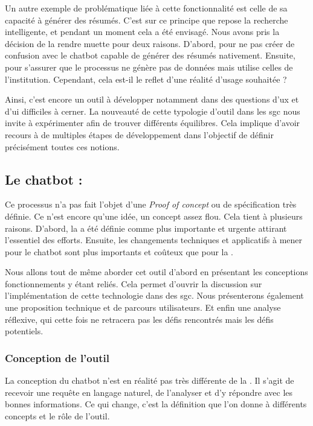 Un autre exemple de problématique liée à cette fonctionnalité est celle de sa capacité à générer des résumés. C'est sur ce principe que repose la recherche intelligente, et pendant un moment cela a été envisagé. Nous avons pris la décision de la rendre muette pour deux raisons. D'abord, pour ne pas créer de confusion avec le \gls{chatbot} capable de générer des résumés nativement. Ensuite, pour s'assurer que le processus ne génère pas de données mais utilise celles de l’institution. Cependant, cela est-il le reflet d'une réalité d'usage souhaitée ?\newline 

Ainsi, c'est encore un outil à développer notamment dans des questions d'\gls{ux} et d'\gls{ui} difficiles à cerner. La nouveauté de cette typologie d'outil dans les \gls{sgc} nous invite à expérimenter afin de trouver différents équilibres. Cela implique d'avoir recours à de multiples étapes de développement dans l'objectif de définir précisément toutes ces notions. 

\subsection{Le \gls{chatbot} :}

Ce processus n'a pas fait l'objet d'une \textit{Proof of concept} ou de spécification très définie. Ce n'est encore qu'une idée, un concept assez flou. Cela tient à plusieurs raisons. D'abord, la  a été définie comme plus importante et urgente attirant l'essentiel des efforts. Ensuite, les changements techniques et applicatifs à mener pour le \gls{chatbot} sont plus importants et coûteux que pour la .\newline

Nous allons tout de même aborder cet outil d'abord en présentant les conceptions fonctionnements y étant reliés. Cela permet d'ouvrir la discussion sur l'implémentation de cette technologie dans des \gls{sgc}. Nous présenterons également une proposition technique et de parcours utilisateurs. Et enfin une analyse réflexive, qui cette fois ne retracera pas les défis rencontrés mais les défis potentiels.

\subsubsection{Conception de l'outil}

La conception du \gls{chatbot} n'est en réalité pas très différente de la . Il s'agit de recevoir une requête en langage naturel, de l'analyser et d'y répondre avec les bonnes informations. Ce qui change, c'est la définition que l'on donne à différents concepts et le rôle de l'outil. 

